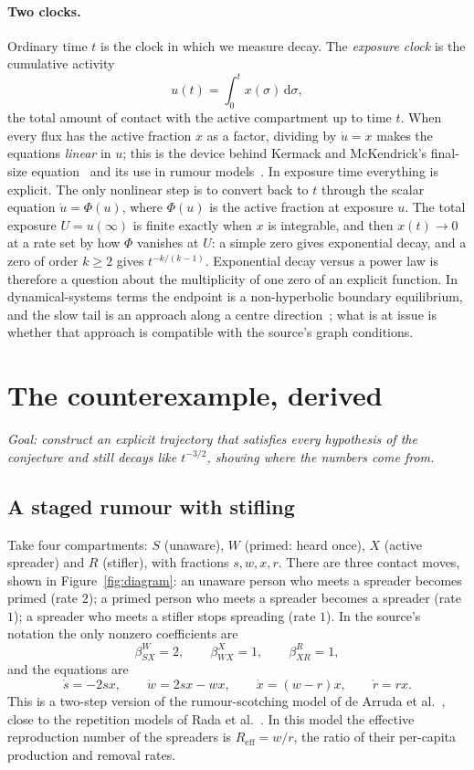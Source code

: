 \documentclass[11pt,a4paper]{article}
\theoremstyle{definition}\newtheorem{definition}[theorem]{Definition}
\theoremstyle{remark}\newtheorem{remark}[theorem]{Remark}
\newcommand{\dd}{\,\mathrm d}
\begin{document}
\paragraph{Two clocks.}
Ordinary time $t$ is the clock in which we measure decay. The
\emph{exposure clock} is the cumulative activity
\[
u(t)=\int_0^tx(\sigma)\dd\sigma,
\]
the total amount of contact with the active compartment up to time $t$.
When every flux has the active fraction $x$ as a factor, dividing by
$\dot u=x$ makes the equations \emph{linear} in $u$; this is the
device behind Kermack and McKendrick's final-size
equation~\cite{KermackMcKendrick} and its use in rumour
models~\cite{Arruda,Rada}. In exposure time everything is explicit.
The only nonlinear step is to convert back to $t$ through the scalar
equation $\dot u=\Phi(u)$, where $\Phi(u)$ is the active fraction at
exposure $u$. The total exposure $U=u(\infty)$ is finite exactly when
$x$ is integrable, and then $x(t)\to0$ at a rate set by how $\Phi$
vanishes at $U$: a simple zero gives exponential decay, and a zero of
order $k\ge2$ gives $t^{-k/(k-1)}$. Exponential decay versus a power law
is therefore a question about the multiplicity of one zero of an
explicit function. In dynamical-systems terms the endpoint is a
non-hyperbolic boundary equilibrium, and the slow tail is an approach
along a centre direction~\cite{Carr}; what is at issue is whether that
approach is compatible with the source's graph conditions.

\section{The counterexample, derived}
\label{sec:counterexample}

\emph{Goal: construct an explicit trajectory that satisfies every
hypothesis of the conjecture and still decays like $t^{-3/2}$, showing
where the numbers come from.}

\subsection{A staged rumour with stifling}

Take four compartments: $S$ (unaware), $W$ (primed: heard once), $X$
(active spreader) and $R$ (stifler), with fractions $s,w,x,r$. There
are three contact moves, shown in Figure~\ref{fig:diagram}: an unaware
person who meets a spreader becomes primed (rate $2$); a primed person
who meets a spreader becomes a spreader (rate $1$); a spreader who
meets a stifler stops spreading (rate $1$). In the source's notation
the only nonzero coefficients are
\[
\beta^W_{SX}=2,\qquad \beta^X_{WX}=1,\qquad \beta^R_{XR}=1,
\]
and the equations are
\begin{equation}
\dot s=-2sx,\qquad \dot w=2sx-wx,\qquad \dot x=(w-r)x,\qquad \dot r=rx.
\label{eq:base}
\end{equation}
This is a two-step version of the rumour-scotching model of de Arruda
et al.~\cite[eq.~(3.2)]{Arruda}, close to the repetition models of Rada
et al.~\cite{Rada}. In this model the effective reproduction number of
the spreaders is $R_{\mathrm{eff}}=w/r$, the ratio of their
per-capita production and removal rates.
\end{document}
